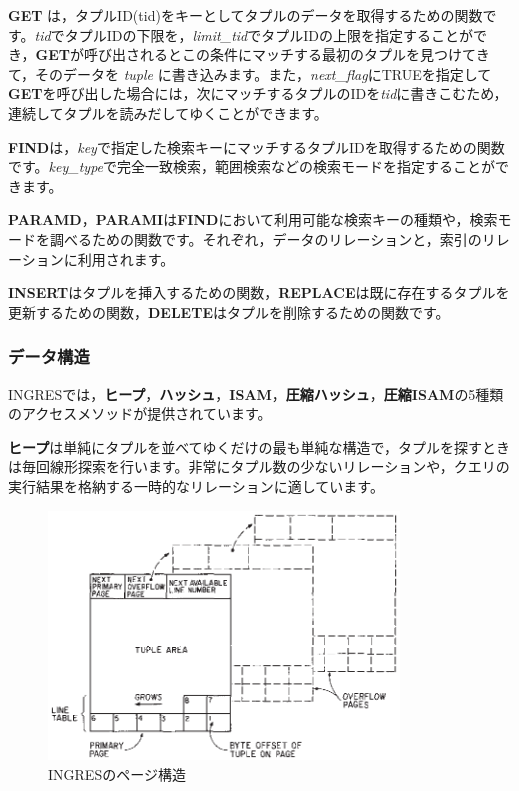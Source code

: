 {\bf GET} は，タプルID(tid)をキーとしてタプルのデータを取得するための関数です。{\it tid}でタプルIDの下限を，{\it limit\_tid}でタプルIDの上限を指定することができ，{\bf GET}が呼び出されるとこの条件にマッチする最初のタプルを見つけてきて，そのデータを {\it tuple} に書き込みます。また，{\it next\_flag}にTRUEを指定して{\bf GET}を呼び出した場合には，次にマッチするタプルのIDを{\it tid}に書きこむため，連続してタプルを読みだしてゆくことができます。


{\bf FIND}は，{\it key}で指定した検索キーにマッチするタプルIDを取得するための関数です。{\it key\_type}で完全一致検索，範囲検索などの検索モードを指定することができます。


{\bf PARAMD}，{\bf PARAMI}は{\bf FIND}において利用可能な検索キーの種類や，検索モードを調べるための関数です。それぞれ，データのリレーションと，索引のリレーションに利用されます。


{\bf INSERT}はタプルを挿入するための関数，{\bf REPLACE}は既に存在するタプルを更新するための関数，{\bf DELETE}はタプルを削除するための関数です。


\subsubsection{データ構造}


INGRESでは，{\bf ヒープ}，{\bf ハッシュ}，{\bf ISAM}，{\bf 圧縮ハッシュ}，{\bf 圧縮ISAM}の5種類のアクセスメソッドが提供されています。


{\bf ヒープ}は単純にタプルを並べてゆくだけの最も単純な構造で，タプルを探すときは毎回線形探索を行います。非常にタプル数の少ないリレーションや，クエリの実行結果を格納する一時的なリレーションに適しています。


\begin{figure}[tb]
 \begin{center}
  \includegraphics[height=66mm]{hayamiz/images/page-layout-ingres.eps}
  \caption{INGRESのページ構造}
  \label{174456_16Jul12}
 \end{center}
\end{figure}


